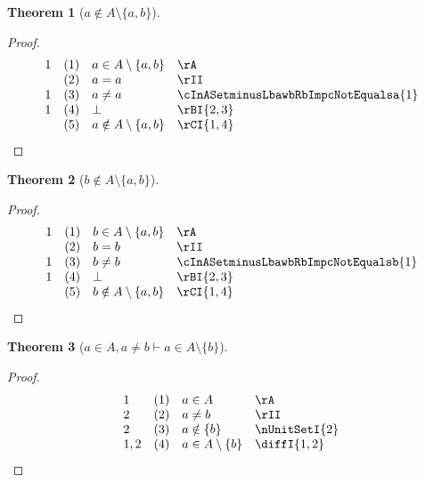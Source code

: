 \documentclass{book}
\theoremstyle{plain}
\newtheorem{theorem}{Theorem}
\theoremstyle{remark}
\theoremstyle{definition}
\begin{document}
\label{aNotinASetminusLbawbRb}
\begin{theorem}[\(a\notin A\setminus\{a,b\}\)]
\end{theorem}
\begin{proof}
    \[
	\begin{array}{llll}
		1 & (1) & a\in A\setminus\{a,b\} & \rA \\
		& (2) & a=a & \rII \\
		1 & (3) & a\neq a & \cInASetminusLbawbRbImpcNotEqualsa{1} \\
		1 & (4) & \bot & \rBI{2,3} \\
		& (5) & a\notin A\setminus\{a,b\} & \rCI{1,4} \\
	\end{array}
    \]
\end{proof}

\label{bNotinASetminusLbawbRb}
\begin{theorem}[\(b\notin A\setminus\{a,b\}\)]
\end{theorem}
\begin{proof}
    \[
	\begin{array}{llll}
		1 & (1) & b\in A\setminus\{a,b\} & \rA \\
		& (2) & b=b & \rII \\
		1 & (3) & b\neq b & \cInASetminusLbawbRbImpcNotEqualsb{1} \\
		1 & (4) & \bot & \rBI{2,3} \\
		& (5) & b\notin A\setminus\{a,b\} & \rCI{1,4} \\
	\end{array}
    \]
\end{proof}

\label{aInAwaNotEqualsbImpaInASetminusLbbRb}
\begin{theorem}[\(a\in A, a\neq b\vdash a\in A\setminus\{b\}\)]
\end{theorem}
\begin{proof}
    \[
	\begin{array}{llll}
		1 & (1) & a\in A & \rA \\
		2 & (2) & a\neq b & \rII \\
		2 & (3) & a\notin \{b\} & \nUnitSetI{2} \\
		1,2 & (4) & a\in A\setminus \{b\} & \diffI{1,2} \\
	\end{array}
    \]
\end{proof}
\end{document}

